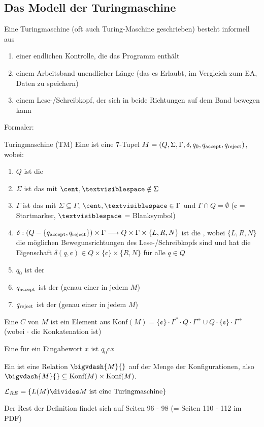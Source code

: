 \subsection{Das Modell der Turingmaschine}
Eine Turingmaschine (oft auch Turing-Maschine geschrieben) besteht informell aus
\begin{enumerate}[label=(\roman*)]
    \item einer endlichen Kontrolle, die das Programm enthält
    \item einem Arbeitsband unendlicher Länge (das es Erlaubt, im Vergleich zum EA, Daten zu speichern)
    \item einem Lese-/Schreibkopf, der sich in beide Richtungen auf dem Band bewegen kann
\end{enumerate}
Formaler:
\begin{definition}[]{Turingmaschine (TM)}
    Eine  ist eine $7$-Tupel $M = (Q, \Sigma, \Gamma, \delta, q_0, q_{\text{accept}}, q_{\text{reject}})$, wobei:
    \begin{enumerate}[label=(\roman*)]
        \item $Q$ ist die 
        \item $\Sigma$ ist das  mit $\cent, \textvisiblespace \notin \Sigma$
        \item $\Gamma$ ist das  mit $\Sigma \subseteq \Gamma$, $\cent, \textvisiblespace \in \Gamma$ und $\Gamma \cap Q = \emptyset$
              ($\cent$ = Startmarker, $\textvisiblespace$ = Blanksymbol)
        \item $\delta : (Q - \{ q_{\text{accept}}, q_{\text{reject}} \}) \times \Gamma \longrightarrow Q \times \Gamma \times \{ L, R, N \}$ ist die ,
              wobei $\{ L, R, N \}$ die möglichen Bewegunsrichtungen des Lese-/Schreibkopfs sind
              und hat die Eigenschaft $\delta(q, \cent) \in Q \times \{ \cent \} \times \{ R, N \}$ für alle $q \in Q$
        \item $q_0$ ist der 
        \item $q_{\text{accept}}$ ist der  (genau einer in jedem $M$)
        \item $q_{\text{reject}}$ ist der  (genau einer in jedem $M$)
    \end{enumerate}
    Eine  $C$ von $M$ ist ein Element aus $\text{Konf}(M) = \{ \cent \} \cdot \Gamma^* \cdot Q \cdot \Gamma^+ \cup Q \cdot \{ \cent \} \cdot \Gamma^+$
    (wobei $\cdot$ die Konkatenation ist)

    Eine  für ein Eingabewort $x$ ist $q_0\cent x$

    Ein  ist eine Relation $\bigvdash{M}{}$ auf der Menge der Konfigurationen, also $\bigvdash{M}{} \subseteq \text{Konf}(M) \times \text{Konf}(M)$.

    $\mathcal{L}_{RE} = \{ L(M) \divides M \text{ ist eine Turingmaschine} \}$

    Der Rest der Definition findet sich auf Seiten 96 - 98 (= Seiten 110 - 112 im PDF)
\end{definition}
